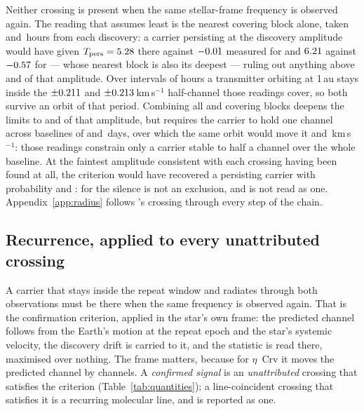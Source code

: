 Neither crossing is present when the same stellar-frame frequency is observed
again.
The reading that assumes least is the nearest covering block alone, taken
\RcSxNearH{} and \EvBDeepH\,hours from each discovery: a carrier persisting at
the discovery amplitude would have given $T_{\rm pers}=5.28$ there
against $-0.01$ measured for \EvAStar{} and $6.21$ against
$-0.57$ for \EvBStar{} --- whose nearest block is also its deepest ---
ruling out anything above \RqNearFracSx{} and
\RqNearFracCp{} of that amplitude. Over intervals of hours a transmitter
orbiting at 1\,au stays inside the $\pm0.211$ and
$\pm0.213$\,km\,s$^{-1}$ half-channel those readings cover, so both
survive an orbit of that period. Combining all \RqNRepSx{} and \RqNRepCp{}
covering blocks deepens the limits to \RcSxFive{} and \RcCpFive{} of that
amplitude, but requires the carrier to hold one channel across baselines of
\RqSpanDSx{} and \RqSpanDCp\,days, over which the same orbit would move it
\RqOrbFarSx{} and \RqOrbFarCp\,km\,s$^{-1}$: those readings constrain only a
carrier stable to half a channel over the whole baseline. At the faintest amplitude consistent with each crossing
having been found at all, the criterion would have recovered a persisting
carrier with probability \RqPowerTrigSx{} and \RqPowerTrigCp: for \EvBStar{}
the silence is not an exclusion, and is not read as one.
Appendix~\ref{app:radius} follows \EvBStar's crossing through every step
of the chain.


\subsection{Recurrence, applied to every unattributed crossing}
\label{sec:etacrv}

A carrier that stays inside the repeat window and radiates through both
observations must be there when the same frequency is observed again. That is
the confirmation criterion, applied in the star's own frame: the predicted
channel follows from the Earth's motion at the repeat epoch and the star's
systemic velocity, the discovery drift is carried to it, and the statistic is
read there, maximised over nothing. The frame matters, because for $\eta$~Crv
it moves the predicted channel by \VnEcrDchan{} channels. A \emph{confirmed
signal} is an \emph{unattributed} crossing that satisfies the criterion
(Table~\ref{tab:quantities}); a line-coincident crossing that satisfies it is
a recurring molecular line, and is reported as one.


